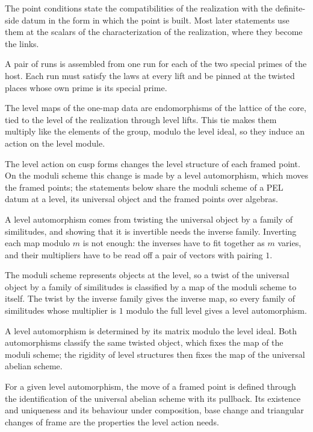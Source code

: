 The point conditions state the compatibilities of the realization with the definite-side datum in
the form in which the point is built. Most later statements use them at the scalars of the
characterization of the realization, where they become the links.

A pair of runs is assembled from one run for each of the two special primes of the host. Each run
must satisfy the laws at every lift and be pinned at the twisted places whose own prime is its
special prime.

The level maps of the one-map data are endomorphisms of the lattice of the core, tied to the level of
the realization through level lifts. This tie makes them multiply like the elements of the group,
modulo the level ideal, so they induce an action on the level module.

The level action on cusp forms changes the level structure of each framed point. On the moduli scheme
this change is made by a level automorphism, which moves the framed points; the statements below share
the moduli scheme of a PEL datum at a level, its universal object and the framed points over algebras.

A level automorphism comes from twisting the universal object by a family of similitudes, and showing
that it is invertible needs the inverse family. Inverting each map modulo $m$ is not enough: the inverses
have to fit together as $m$ varies, and their multipliers have to be read off a pair of vectors with
pairing $1$.

The moduli scheme represents objects at the level, so a twist of the universal object by a family of
similitudes is classified by a map of the moduli scheme to itself. The twist by the inverse family gives
the inverse map, so every family of similitudes whose multiplier is $1$ modulo the full level gives a
level automorphism.

A level automorphism is determined by its matrix modulo the level ideal. Both automorphisms classify
the same twisted object, which fixes the map of the moduli scheme; the rigidity of level structures then
fixes the map of the universal abelian scheme.

For a given level automorphism, the move of a framed point is defined through the identification of the
universal abelian scheme with its pullback. Its existence and uniqueness and its behaviour under
composition, base change and triangular changes of frame are the properties the level action needs.

